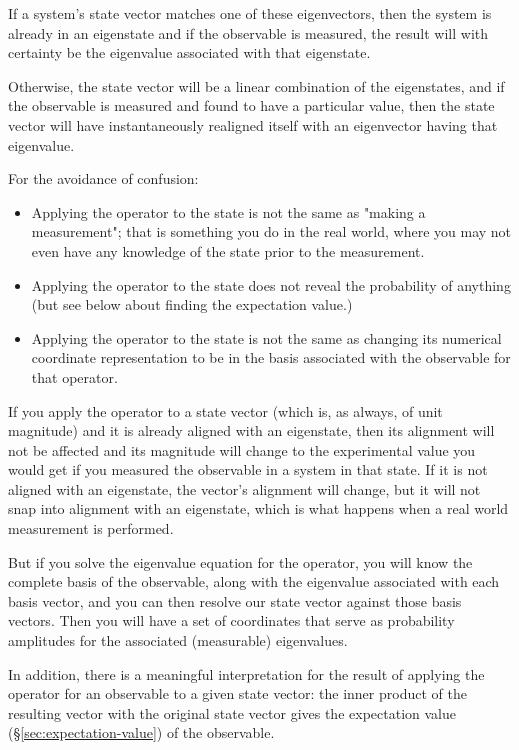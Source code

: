If a system's state vector matches one of these eigenvectors, then the system is already in an eigenstate and if the observable is measured, the result will with certainty be the eigenvalue associated with that eigenstate.

Otherwise, the state vector will be a linear combination of the eigenstates, and if the observable is measured and found to have a particular value, then the state vector will have instantaneously realigned itself with an eigenvector having that eigenvalue.

For the avoidance of confusion:

\begin{itemize}
  \item Applying the operator to the state is not the same as "making a measurement"; that is something you do in the real world, where you may not even have any knowledge of the state prior to the measurement.
  \item Applying the operator to the state does not reveal the probability of anything (but see below about finding the expectation value.)
  \item Applying the operator to the state is not the same as changing its numerical coordinate representation to be in the basis associated with the observable for that operator.
\end{itemize}

If you apply the operator to a state vector (which is, as always, of unit magnitude) and it is already aligned with an eigenstate, then its alignment will not be affected and its magnitude will change to the experimental value you would get if you measured the observable in a system in that state. If it is not aligned with an eigenstate, the vector's alignment will change, but it will not snap into alignment with an eigenstate, which is what happens when a real world measurement is performed.

But if you solve the eigenvalue equation for the operator, you will know the complete basis of the observable, along with the eigenvalue associated with each basis vector, and you can then resolve our state vector against those basis vectors. Then you will have a set of coordinates that serve as probability amplitudes for the associated (measurable) eigenvalues.

In addition, there is a meaningful interpretation for the result of applying the operator for an observable to a given state vector: the inner product of the resulting vector with the original state vector gives the expectation value (§\ref{sec:expectation-value}) of the observable.

